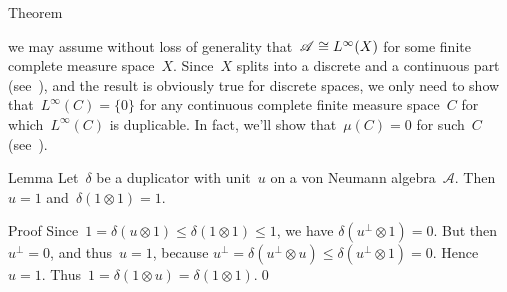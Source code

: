 \documentclass[a]{subfiles}
\begin{document}
\begin{parsec}
\begin{point}[duplicable]{Theorem}
\begin{point}
we may assume without loss of generality
that~$\mathscr{A}\cong L^\infty(X)$ for some finite complete measure space~$X$.
Since~$X$ splits into a discrete and a continuous
part (see~),
and the result is obviously true for discrete spaces,
we only need to show that~$L^\infty(C)=\{0\}$
for any continuous complete finite measure space~$C$
for which~$L^\infty(C)$ is duplicable.
In fact,
we'll show that~$\mu(C)=0$
for such~$C$
(see~).
\end{point}
\end{point}
\begin{point}{Lemma}%
Let~$\delta$
be a duplicator 
with unit~$u$
on a von Neumann algebra~$\mathscr{A}$.
Then~$u=1$ and~$\delta(1\otimes 1)=1$.
\begin{point}{Proof}%
Since~$1=\delta(u\otimes 1)\leq \delta(1\otimes 1) \leq 1$,
we have $\delta(u^\perp\otimes 1)=0$.
But then~$u^\perp=0$, and thus~$u=1$,
because  $u^\perp = \delta(u^\perp \otimes u)
\leq \delta(u^\perp \otimes 1) = 0$.
Hence~$u=1$.
Thus~$1=\delta(1\otimes u)=\delta(1\otimes 1)$.\qed
\end{point}
\end{point}
\end{parsec}
\end{document}
